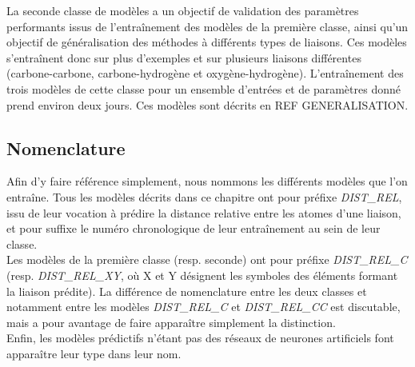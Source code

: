 \par La seconde classe de modèles a un objectif de validation des paramètres performants issus de l'entraînement des modèles de la première classe, ainsi qu'un objectif de généralisation des méthodes à différents types de liaisons. Ces modèles s'entraînent donc sur plus d'exemples et sur plusieurs liaisons différentes (carbone-carbone, carbone-hydrogène et oxygène-hydrogène). L'entraînement des trois modèles de cette classe pour un ensemble d'entrées et de paramètres donné prend environ deux jours. Ces modèles sont décrits en REF GENERALISATION.

\subsection{Nomenclature}
\par Afin d'y faire référence simplement, nous nommons les différents modèles que l'on entraîne. Tous les modèles décrits dans ce chapitre ont pour préfixe \emph{DIST\_REL}, issu de leur vocation à prédire la distance relative entre les atomes d'une liaison, et pour suffixe le numéro chronologique de leur entraînement au sein de leur classe.\\
Les modèles de la première classe (resp. seconde) ont pour préfixe \emph{DIST\_REL\_C} (resp. \emph{DIST\_REL\_XY}, où X et Y désignent les symboles des éléments formant la liaison prédite). La différence de nomenclature entre les deux classes et notamment entre les modèles \emph{DIST\_REL\_C} et \emph{DIST\_REL\_CC} est discutable, mais a pour avantage de faire apparaître simplement la distinction.\\
Enfin, les modèles prédictifs n'étant pas des réseaux de neurones artificiels font apparaître leur type dans leur nom.
